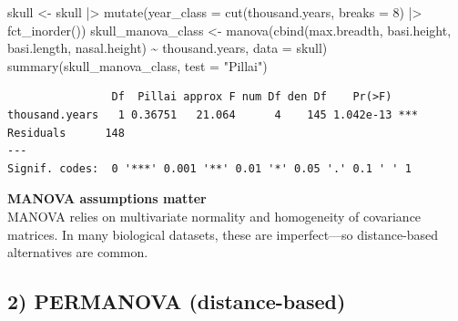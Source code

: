 \documentclass[
  letterpaper,
  8pt,
  a4paper]{book}
\newenvironment{Shaded}{\begin{snugshade}}{\end{snugshade}}
\newcommand{\AttributeTok}[1]{\textcolor[rgb]{0.40,0.45,0.13}{#1}}
\newcommand{\DecValTok}[1]{\textcolor[rgb]{0.68,0.00,0.00}{#1}}
\newcommand{\FunctionTok}[1]{\textcolor[rgb]{0.28,0.35,0.67}{#1}}
\newcommand{\NormalTok}[1]{\textcolor[rgb]{0.00,0.23,0.31}{#1}}
\newcommand{\OtherTok}[1]{\textcolor[rgb]{0.00,0.23,0.31}{#1}}
\newcommand{\SpecialCharTok}[1]{\textcolor[rgb]{0.37,0.37,0.37}{#1}}
\newcommand{\StringTok}[1]{\textcolor[rgb]{0.13,0.47,0.30}{#1}}
\begin{document}
\begin{Shaded}
\begin{Highlighting}[]
\NormalTok{skull }\OtherTok{\textless{}{-}}\NormalTok{ skull }\SpecialCharTok{|\textgreater{}}
  \FunctionTok{mutate}\NormalTok{(}\AttributeTok{year\_class =} \FunctionTok{cut}\NormalTok{(thousand.years, }\AttributeTok{breaks =} \DecValTok{8}\NormalTok{) }\SpecialCharTok{|\textgreater{}} \FunctionTok{fct\_inorder}\NormalTok{())}
\NormalTok{skull\_manova\_class }\OtherTok{\textless{}{-}} \FunctionTok{manova}\NormalTok{(}\FunctionTok{cbind}\NormalTok{(max.breadth, basi.height, basi.length, nasal.height) }\SpecialCharTok{\textasciitilde{}}\NormalTok{ thousand.years,}
                      \AttributeTok{data =}\NormalTok{ skull)}
\FunctionTok{summary}\NormalTok{(skull\_manova\_class, }\AttributeTok{test =} \StringTok{"Pillai"}\NormalTok{)}
\end{Highlighting}
\end{Shaded}

\begin{verbatim}
                Df  Pillai approx F num Df den Df    Pr(>F)    
thousand.years   1 0.36751   21.064      4    145 1.042e-13 ***
Residuals      148                                             
---
Signif. codes:  0 '***' 0.001 '**' 0.01 '*' 0.05 '.' 0.1 ' ' 1
\end{verbatim}

\begin{tcolorbox}[enhanced jigsaw, arc=.35mm, bottomrule=.15mm, bottomtitle=1mm, breakable, colback=white, colbacktitle=quarto-callout-caution-color!10!white, colframe=quarto-callout-caution-color-frame, coltitle=black, left=2mm, leftrule=.75mm, opacityback=0, opacitybacktitle=0.6, rightrule=.15mm, title=\textcolor{quarto-callout-caution-color}{\faFire}\hspace{0.5em}{Caution}, titlerule=0mm, toprule=.15mm, toptitle=1mm]

\textbf{MANOVA assumptions matter}\\
MANOVA relies on multivariate normality and homogeneity of covariance
matrices. In many biological datasets, these are imperfect---so
distance-based alternatives are common.

\end{tcolorbox}

\subsection*{2) PERMANOVA
(distance-based)}\label{permanova-distance-based}
\end{document}

